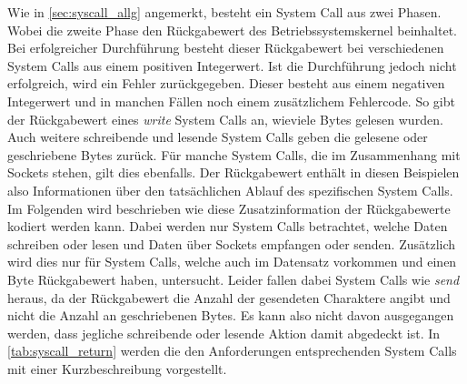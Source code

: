                    Wie in \autoref{sec:syscall_allg} angemerkt, besteht ein System Call aus zwei \glqq Phasen\grqq.
                    Wobei die zweite Phase den Rückgabewert des Betriebssystemskernel beinhaltet.
                    Bei erfolgreicher Durchführung besteht dieser Rückgabewert bei verschiedenen System Calls aus einem positiven Integerwert.
                    Ist die Durchführung jedoch nicht erfolgreich, wird ein Fehler zurückgegeben.
                    Dieser besteht aus einem negativen Integerwert und in manchen Fällen noch einem zusätzlichem Fehlercode.
                    So gibt der Rückgabewert eines \textit{write} System Calls an, wieviele Bytes gelesen wurden.
                    Auch weitere schreibende und lesende System Calls geben die gelesene oder geschriebene Bytes zurück.
                    Für manche System Calls, die im Zusammenhang mit Sockets stehen, gilt dies ebenfalls.
                    Der Rückgabewert enthält in diesen Beispielen also Informationen über den tatsächlichen Ablauf des spezifischen System Calls.
                    Im Folgenden wird beschrieben wie diese Zusatzinformation der Rückgabewerte kodiert werden kann.
                    Dabei werden nur System Calls betrachtet, welche Daten schreiben oder lesen und Daten über Sockets empfangen oder senden. 
                    Zusätzlich wird dies nur für System Calls, welche auch im Datensatz vorkommen und einen Byte Rückgabewert haben, untersucht.
                    Leider fallen dabei System Calls wie \textit{send} heraus, da der Rückgabewert die Anzahl der gesendeten Charaktere angibt und nicht die Anzahl an geschriebenen Bytes.
                    Es kann also nicht davon ausgegangen werden, dass jegliche schreibende oder lesende Aktion damit abgedeckt ist.
                    In \autoref{tab:syscall_return} werden die den Anforderungen entsprechenden System Calls mit einer Kurzbeschreibung vorgestellt.

